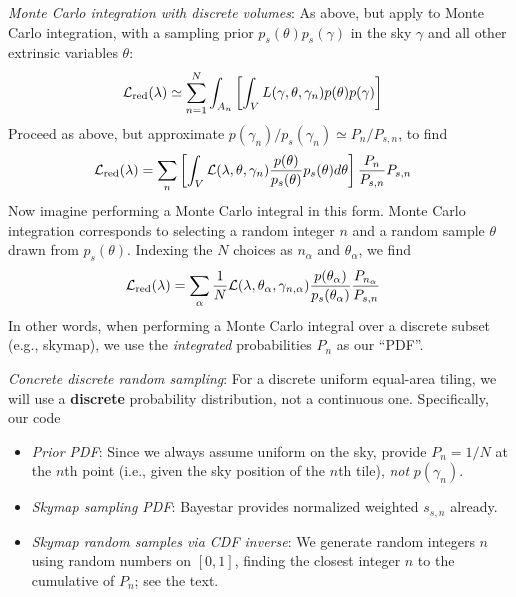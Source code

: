 \noindent \emph{Monte Carlo integration with discrete volumes}: As above, but apply to Monte Carlo integration, with a
sampling prior $p_s(\theta)p_s(\gamma)$ in the sky $\gamma$ and all other extrinsic variables $\theta$:
\begin{align}
{\cal L}_{\rm red}(\lambda)
& \simeq  \sum_{n=1}^N \int_{A_n} \left [\int_V  L(\gamma,\theta,\gamma_n) p(\theta)p(\gamma) \right]
\end{align}
Proceed as above, but approximate $p(\gamma_n)/p_s(\gamma_n) \simeq P_n/P_{s,n}$, to find
\begin{align}
{\cal L}_{\rm red}(\lambda)
& =\sum_n \left[\int_{V}{\cal L}(\lambda,\theta,\gamma_n)\frac{p(\theta)}{p_s(\theta)}p_s(\theta)d\theta \right] \frac{ P_n }{P_{s,n}} P_{s,n}
\end{align}
Now imagine performing a Monte Carlo integral in this form.   Monte Carlo integration corresponds to selecting a random
integer $n$ and a random sample $\theta$ drawn from $p_s(\theta)$.  Indexing the $N$ choices as $n_{\alpha}$ and
$\theta_\alpha$, we find
\begin{align}
{\cal L}_{\rm red}(\lambda)
& = \sum_{\alpha}\frac{1}{N}
{\cal L}(\lambda,\theta_{\alpha},\gamma_{n,\alpha})\frac{p(\theta_\alpha)}{p_s(\theta_\alpha)} \frac{ P_{n_\alpha}
}{P_{s,n}} 
\end{align}
In other words, when performing a Monte Carlo integral over a discrete subset (e.g., skymap), we use the
\emph{integrated} probabilities $P_n$ as our ``PDF''.

\emph{Concrete discrete random sampling}: For a discrete uniform equal-area tiling, we will use a
\textbf{discrete} probability distribution, not a continuous one.   Specifically, our code 
\begin{itemize}
\item \emph{Prior PDF}: Since we always assume uniform on the sky,  provide $P_n=1/N$ at the $n$th
point (i.e., given the sky position of the $n$th tile), \emph{not} $p(\gamma_n)$.

\item \emph{Skymap sampling PDF}: Bayestar provides normalized weighted $s_{s,n}$ already.  

\item \emph{Skymap random samples via CDF inverse}: We generate random integers $n$ using random numbers on $[0,1]$, finding the
  closest integer $n$ to the  cumulative of $P_n$; see the text.
\end{itemize}





